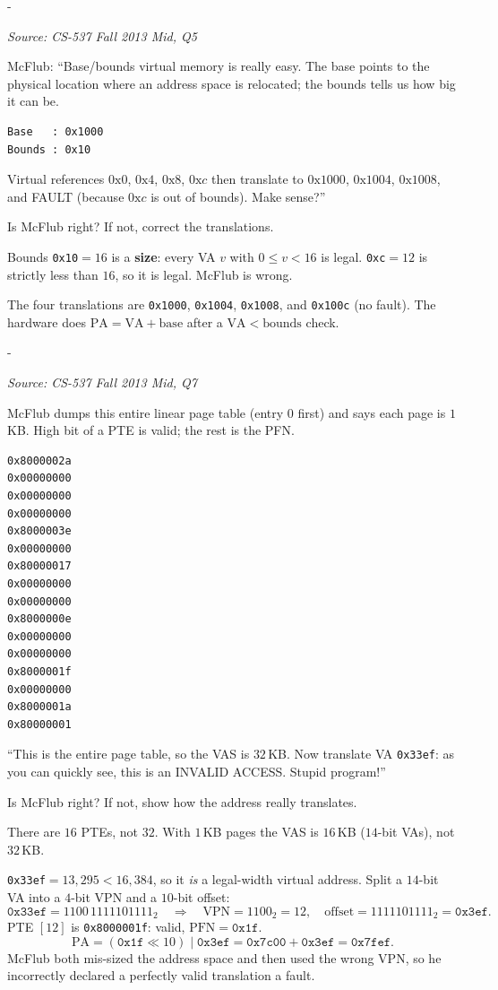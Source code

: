 \documentclass[11pt,a4paper]{article}
\makeatletter
\newcommand{\keepspace}[1]{\par\penalty-100\begingroup
  \setlength{\dimen@}{#1}\dimen@ii\pagegoal\advance\dimen@ii-\pagetotal
  \ifdim\dimen@>\dimen@ii\ifdim\dimen@ii>\z@\vfil\fi\break\fi\endgroup}
\newcounter{qn}[section]
\newenvironment{Qn}[4]{%
  \refstepcounter{qn}\keepspace{7\baselineskip}%
  \begin{tcolorbox}[qboxstyle, title={Q\thesection.\theqn\ \ [#1 \textbar\ #2]\ \ #4}]%
  {\footnotesize\color{g3}\textit{Source: #3}}\par\smallskip%
}{%
  \end{tcolorbox}%
}
\newenvironment{Sol}{%
  \begin{tcolorbox}[sboxstyle, title={Solution}]%
}{%
  \end{tcolorbox}\vspace{0.35em}%
}
\makeatother
\begin{document}
\begin{Qn}{Medium-Hard}{Lect 9}{CS-537 Fall 2013 Mid, Q5}{McFlub faults a legal base-and-bounds address}
McFlub: ``Base/bounds virtual memory is really easy. The base points to
the physical location where an address space is relocated; the bounds
tells us how big it can be.

\begin{lstlisting}[numbers=none]
Base   : 0x1000
Bounds : 0x10
\end{lstlisting}
Virtual references $0\mathrm{x}0$, $0\mathrm{x}4$, $0\mathrm{x}8$,
$0\mathrm{x}c$ then translate to $0\mathrm{x}1000$,
$0\mathrm{x}1004$, $0\mathrm{x}1008$, and FAULT (because
$0\mathrm{x}c$ is out of bounds). Make sense?''

Is McFlub right? If not, correct the translations.
\end{Qn}
\begin{Sol}
Bounds \texttt{0x10}$=16$ is a \textbf{size}: every VA $v$ with
$0\le v<16$ is legal. \texttt{0xc}$=12$ is strictly less than $16$,
so it is legal. McFlub is wrong.

The four translations are
\texttt{0x1000}, \texttt{0x1004}, \texttt{0x1008}, and
\texttt{0x100c} (no fault). The hardware does
$\mathrm{PA}=\mathrm{VA}+\mathrm{base}$ after a
$\mathrm{VA}<\mathrm{bounds}$ check.
\end{Sol}

\begin{Qn}{Hard}{Lect 12}{CS-537 Fall 2013 Mid, Q7}{McFlub's linear-page-table translation of \texttt{0x33ef}}
McFlub dumps this entire linear page table (entry $0$ first) and says
each page is $1$\,KB. High bit of a PTE is valid; the rest is the PFN.
\begin{lstlisting}[numbers=none]
0x8000002a
0x00000000
0x00000000
0x00000000
0x8000003e
0x00000000
0x80000017
0x00000000
0x00000000
0x8000000e
0x00000000
0x00000000
0x8000001f
0x00000000
0x8000001a
0x80000001
\end{lstlisting}
``This is the entire page table, so the VAS is $32$\,KB. Now translate
VA \texttt{0x33ef}: as you can quickly see, this is an INVALID ACCESS.
Stupid program!''

Is McFlub right? If not, show how the address really translates.
\end{Qn}
\begin{Sol}
There are $16$ PTEs, not $32$. With $1$\,KB pages the VAS is
$16$\,KB ($14$-bit VAs), not $32$\,KB.

\texttt{0x33ef}$=13{,}295<16{,}384$, so it \emph{is} a legal-width
virtual address. Split a $14$-bit VA into a $4$-bit VPN and a
$10$-bit offset:
\[
\texttt{0x33ef}=1100\,1111101111_2
\quad\Rightarrow\quad
\mathrm{VPN}=1100_2=12,\quad
\mathrm{offset}=1111101111_2=\texttt{0x3ef}.
\]
PTE $[12]$ is \texttt{0x8000001f}: valid, $\mathrm{PFN}=\texttt{0x1f}$.
\[
\mathrm{PA}=(\texttt{0x1f}\ll 10)\mid\texttt{0x3ef}
=\texttt{0x7c00}+\texttt{0x3ef}=\texttt{0x7fef}.
\]
McFlub both mis-sized the address space and then used the wrong VPN,
so he incorrectly declared a perfectly valid translation a fault.
\end{Sol}
\end{document}
